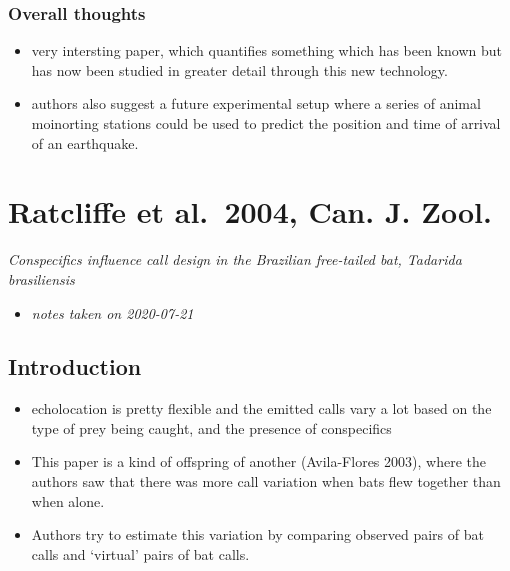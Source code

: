 \documentclass[
]{book}
\providecommand{\tightlist}{%
  \setlength{\itemsep}{0pt}\setlength{\parskip}{0pt}}
\begin{document}
\hypertarget{overall-thoughts}{%
\subsection{Overall thoughts}\label{overall-thoughts}}

\begin{itemize}
\item
  very intersting paper, which quantifies something which has been known but has now been studied in greater detail through this new technology.
\item
  authors also suggest a future experimental setup where a series of animal moinorting stations could be used to predict the position and time of arrival of an earthquake.
\end{itemize}

\hypertarget{ratcliffe-et-al.-2004-can.-j.-zool.}{%
\chapter{Ratcliffe et al.~2004, Can. J. Zool.}\label{ratcliffe-et-al.-2004-can.-j.-zool.}}


\emph{Conspecifics influence call design in the Brazilian free-tailed bat, Tadarida brasiliensis} \citep{ratcliffe2004conspecifics}

\begin{itemize}
\tightlist
\item
  \emph{notes taken on 2020-07-21}
\end{itemize}

\hypertarget{introduction}{%
\section{Introduction}\label{introduction}}

\begin{itemize}
\tightlist
\item
  echolocation is pretty flexible and the emitted calls vary a lot based on the type of prey being caught, and the presence of conspecifics
\item
  This paper is a kind of offspring of another (Avila-Flores 2003), where the authors saw that there was more call variation when bats flew together than when alone.
\item
  Authors try to estimate this variation by comparing observed pairs of bat calls and `virtual' pairs of bat calls.
\end{itemize}
\end{document}
